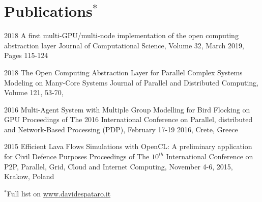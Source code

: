 \documentclass[]{twentysecondscv}
\begin{document}
\section{Publications$^*$}

\begin{twenty}
    \twentyitem
    {2018}
    {A first multi-GPU/multi-node implementation of the open computing abstraction layer}
    {}
    {\footnotesize{Journal of Computational Science, Volume 32, March 2019, Pages 115-124  \href{https://doi.org/10.1016/j.jocs.2018.09.012}{\faBook}}}

    \twentyitem
    {2018}
    {The Open Computing Abstraction Layer for Parallel Complex Systems Modeling on Many-Core Systems}
    {}
    {\footnotesize{Journal of Parallel and Distributed Computing, Volume 121, 53-70, \href{https://doi.org/10.1016/j.jpdc.2018.07.005}{\faBook}}} 
    
    \twentyitem
    {2016}
    {Multi-Agent System with Multiple Group Modelling for Bird Flocking on GPU}
    {}
    {\footnotesize{Proceedings of The 2016 International Conference on Parallel, distributed and Network-Based Processing (PDP), February 17-19 2016, Crete, Greece}}
    
    
    \twentyitem
    {2015}
    {Efficient Lava Flows Simulations with OpenCL: A preliminary application for Civil Defence Purposes}
    {}
    {\footnotesize{Proceedings of The $10^{th}$ International Conference on P2P, Parallel, Grid, Cloud and Internet Computing, November 4-6, 2015, Krakow, Poland}}
\end{twenty}
\footnotesize $^*$Full list on \url{www.davidespataro.it}
\vspace{-5cm}



\end{document}
